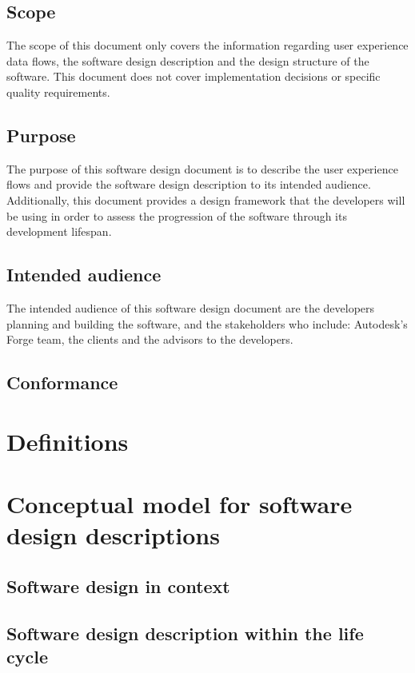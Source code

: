 \documentclass[letterpaper, 10pt, draftclsnofoot, compsoc, onecolumn]{IEEEtran}
\begin{document}
\subsection{Scope}
The scope of this document only covers the information regarding user experience data flows, the software design description and the design structure of the software. This document does not cover implementation decisions or specific quality requirements.
\subsection{Purpose}
The purpose of this software design document is to describe the user experience flows and provide the software design description to its intended audience. Additionally, this document provides a design framework that the developers will be using in order to assess the progression of the software through its development lifespan.
\subsection{Intended audience}
The intended audience of this software design document are the developers planning and building the software, and the stakeholders who include: Autodesk's Forge team, the clients and the advisors to the developers.
\subsection{Conformance}

\section{Definitions}
	
\section{Conceptual model for software design descriptions}

\subsection{Software design in context}

\subsection{Software design description within the life cycle}
\end{document}
